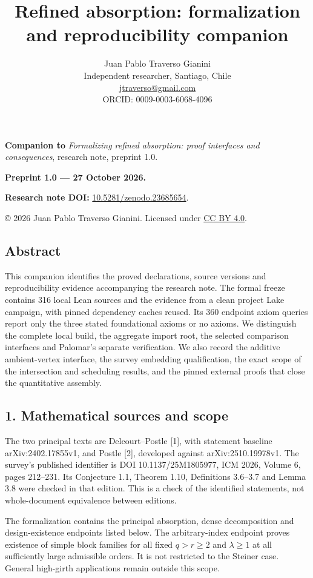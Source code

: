 \documentclass[english,11pt,a4paper]{article}
\title{Refined absorption: formalization and reproducibility companion}
\author{Juan Pablo Traverso Gianini\\
\small Independent researcher, Santiago, Chile\\
\small \href{mailto:jtraverso@gmail.com}{jtraverso@gmail.com}\\
\small ORCID: 0009-0003-6068-4096}
\date{}
\begin{document}
\raggedbottom
{}
\makeatletter
{}
\makeatother
\maketitle
\textbf{Companion to} \emph{Formalizing refined absorption: proof interfaces and consequences}, research note, preprint 1.0.

\textbf{Preprint 1.0 --- 27 October 2026.}

\textbf{Research note DOI:} \href{https://doi.org/10.5281/zenodo.23685654}{10.5281/zenodo.23685654}.

© 2026 Juan Pablo Traverso Gianini. Licensed under \href{https://creativecommons.org/licenses/by/4.0/}{CC BY 4.0}.

\subsection{Abstract}\label{abstract}

This companion identifies the proved declarations, source versions and reproducibility evidence accompanying the research note. The formal freeze contains 316 local Lean sources and the evidence from a clean project Lake campaign, with pinned dependency caches reused. Its 360 endpoint axiom queries report only the three stated foundational axioms or no axioms. We distinguish the complete local build, the aggregate import root, the selected comparison interfaces and Palomar's separate verification. We also record the additive ambient-vertex interface, the survey embedding qualification, the exact scope of the intersection and scheduling results, and the pinned external proofs that close the quantitative assembly.

\subsection{1. Mathematical sources and scope}\label{mathematical-sources-and-scope}

The two principal texts are Delcourt--Postle {[}1{]}, with statement baseline arXiv:2402.17855v1, and Postle {[}2{]}, developed against arXiv:2510.19978v1. The survey's published identifier is DOI 10.1137/25M1805977, ICM 2026, Volume 6, pages 212--231. Its Conjecture 1.1, Theorem 1.10, Definitions 3.6--3.7 and Lemma 3.8 were checked in that edition. This is a check of the identified statements, not whole-document equivalence between editions.

The formalization contains the principal absorption, dense decomposition and design-existence endpoints listed below. The arbitrary-index endpoint proves existence of simple block families for all fixed \(q>r\ge2\) and \(\lambda\ge1\) at all sufficiently large admissible orders. It is not restricted to the Steiner case. General high-girth applications remain outside this scope.
\end{document}

